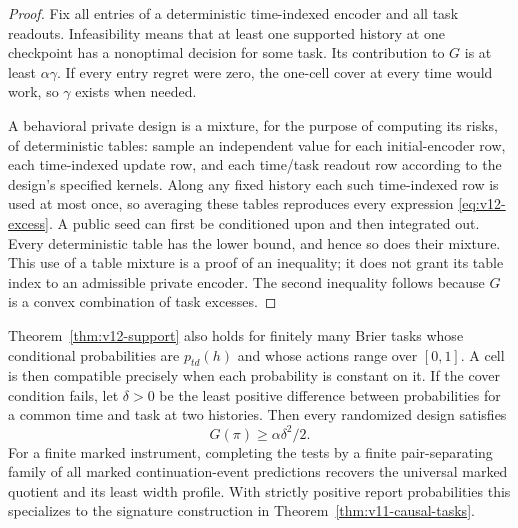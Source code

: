 \begin{proof}
Fix all entries of a deterministic time-indexed encoder and all task
readouts. Infeasibility means that at least one supported history at one
checkpoint has a nonoptimal decision for some task. Its contribution to
$G$ is at least $\alpha\gamma$. If every entry regret were zero, the
one-cell cover at every time would work, so $\gamma$ exists when needed.

A behavioral private design is a mixture, for the purpose of computing
its risks, of deterministic tables: sample an independent value for each
initial-encoder row, each time-indexed update row, and each time/task
readout row according to the design's specified kernels. Along any fixed
history each such time-indexed row is used at most once, so averaging
these tables reproduces every expression \eqref{eq:v12-excess}.
A public seed can first be conditioned upon and then integrated out.
Every deterministic table has the lower bound, and hence so does their
mixture. This use of a table mixture is a proof of an inequality; it does
not grant its table index to an admissible private encoder. The second
inequality follows because $G$ is a convex combination of task excesses.
\end{proof}

\begin{corollary}
\label{cor:v12-prediction}
Theorem~\ref{thm:v12-support} also holds for finitely many Brier tasks
whose conditional probabilities are $p_{td}(h)$ and whose actions range
over $[0,1]$. A cell is then compatible precisely when each probability
is constant on it. If the cover condition fails, let $\delta>0$ be the
least positive difference between probabilities for a common time and
task at two histories. Then every randomized design satisfies
\[
 G(\pi)\ge \alpha\delta^2/2.
\]
For a finite marked instrument, completing the tests by a finite
pair-separating family of all marked continuation-event predictions
recovers the universal marked quotient and its least width profile.
With strictly positive report probabilities this specializes to the
signature construction in Theorem~\ref{thm:v11-causal-tasks}.
\end{corollary}

